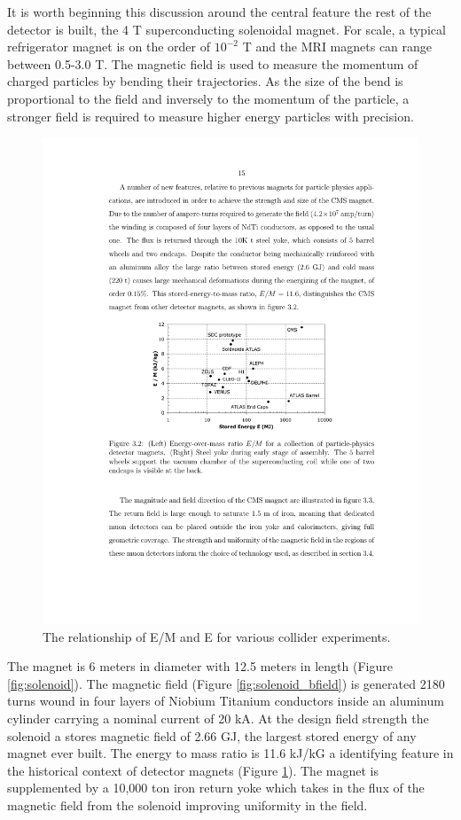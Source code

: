 It is worth beginning this discussion around the central feature the rest of the detector is built, the 
4 T  superconducting solenoidal magnet. For scale, a typical refrigerator magnet is on the 
order of $10^{-2}$ T and the MRI magnets can range between 0.5-3.0 T. The magnetic field is used
to measure the momentum of charged particles by bending their trajectories. As the size of the bend is
proportional to the field and inversely to the momentum of the particle, a stronger field is required 
to measure higher energy particles with precision. 

\begin{figure}
\begin{center}
\includegraphics[width=.85\textwidth]{pics/CMS_EoverM}
\end{center}
\caption{The relationship of E/M and E for various collider experiments.}
\label{fig:eoverm}
\end{figure}

The magnet is 6 meters in diameter with 12.5 meters in length (Figure \ref{fig:solenoid}). The magnetic field (Figure \ref{fig:solenoid_bfield}) is generated 2180 turns wound in four layers of Niobium Titanium conductors inside an aluminum cylinder carrying a
 nominal current of 20 kA.  At the design field strength the solenoid a stores magnetic field of 
2.66 GJ, the largest stored energy of any magnet ever built. The energy to mass ratio is 11.6 kJ/kG a identifying 
feature in the historical context of detector magnets (Figure \ref{fig:eoverm}). The magnet is supplemented 
by a 10,000 ton iron return yoke which takes in the flux of the magnetic field from the solenoid improving
uniformity in the field.

